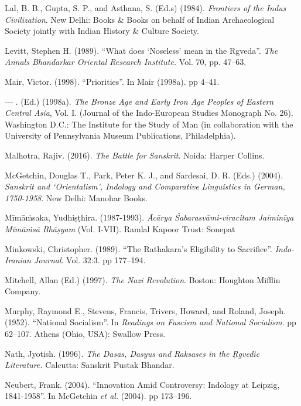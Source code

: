 \begin{thebibliography}{99}
  Lal, B. B., Gupta, S. P., and Asthana, S. (Ed.s) (1984).\textit{ Frontiers of the Indus Civilization}. New Delhi: Books \& Books on behalf of Indian Archaeological Society jointly with Indian History \& Culture Society.

  Levitt, Stephen H. (1989). “What does ‘Noseless’ mean in the Rgveda”. \textit{The Annals Bhandarkar Oriental Research Institute.} Vol. 70, pp. 47--63.

  Mair, Victor. (1998). “Priorities”. In Mair (1998a). pp 4--41.

  — . (Ed.) (1998a). \textit{The Bronze Age and Early Iron Age Peoples of Eastern Central Asia}, Vol. I. (Journal of the Indo-European Studies Monograph No. 26). Washington D.C.: The Institute for the Study of Man (in collaboration with the University of Pennsylvania Museum Publications, Philadelphia).

  Malhotra, Rajiv. (2016). \textit{The Battle for Sanskrit}. Noida: Harper Collins.

  McGetchin, Douglas T., Park, Peter K. J., and Sardesai, D. R. (Eds.) (2004). \textit{Sanskrit and ‘Orientalism’, Indology and Comparative Linguistics in German, 1750-1958}. New Delhi: Manohar Books.

  Mīmāṁsaka, Yudhiṣṭhira. (1987-1993). \textit{Ācārya Śabarasvāmi-viracitam Jaiminīya Mīmāṁsā Bhāṣyam} (Vol. I-VII). Ramlal Kapoor Trust: Sonepat

  Minkowski, Christopher. (1989). “The Rathakara’s Eligibility to Sacrifice”. \textit{Indo-Iranian Journal}. Vol. 32:3. pp 177--194.

  Mitchell, Allan (Ed.) (1997). \textit{The Nazi Revolution}. Boston: Houghton Mifflin Company.

  Murphy, Raymond E., Stevens, Francis, Trivers, Howard, and Roland, Joseph. (1952). “National Socialism”. In \textit{Readings on Fascism and National Socialism}. pp 62--107. Athens (Ohio, USA): Swallow Press.

  Nath, Jyotish. (1996). \textit{The Dasas, Dasyus and Raksases in the Ṛgvedic Literature.} Calcutta: Sanskrit Pustak Bhandar.

  Neubert, Frank. (2004). “Innovation Amid Controversy: Indology at Leipzig, 1841-1958”. In McGetchin \textit{et al.} (2004). pp 173--196.


\end{thebibliography}
